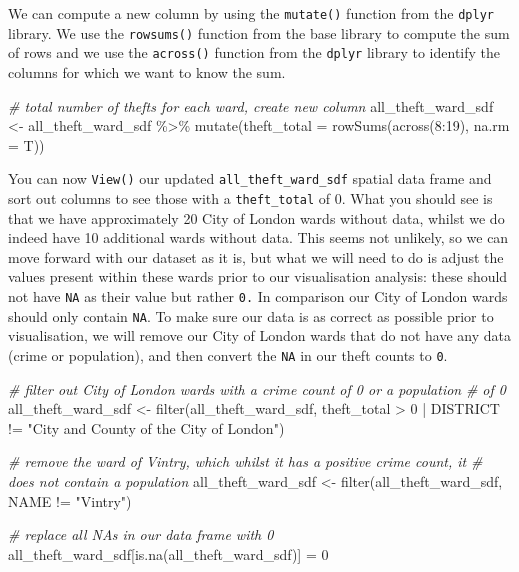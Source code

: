 \documentclass[
]{book}
\newenvironment{Shaded}{\begin{snugshade}}{\end{snugshade}}
\newcommand{\AttributeTok}[1]{\textcolor[rgb]{0.77,0.63,0.00}{#1}}
\newcommand{\CommentTok}[1]{\textcolor[rgb]{0.56,0.35,0.01}{\textit{#1}}}
\newcommand{\DecValTok}[1]{\textcolor[rgb]{0.00,0.00,0.81}{#1}}
\newcommand{\FunctionTok}[1]{\textcolor[rgb]{0.00,0.00,0.00}{#1}}
\newcommand{\NormalTok}[1]{#1}
\newcommand{\OtherTok}[1]{\textcolor[rgb]{0.56,0.35,0.01}{#1}}
\newcommand{\SpecialCharTok}[1]{\textcolor[rgb]{0.00,0.00,0.00}{#1}}
\newcommand{\StringTok}[1]{\textcolor[rgb]{0.31,0.60,0.02}{#1}}
\begin{document}
We can compute a new column by using the \texttt{mutate()} function from the \texttt{dplyr} library. We use the \texttt{rowsums()} function from the base library to compute the sum of rows and we use the \texttt{across()} function from the \texttt{dplyr} library to identify the columns for which we want to know the sum.

\begin{Shaded}
\begin{Highlighting}[]
\CommentTok{\# total number of thefts for each ward, create new column}
\NormalTok{all\_theft\_ward\_sdf }\OtherTok{\textless{}{-}}\NormalTok{ all\_theft\_ward\_sdf }\SpecialCharTok{\%\textgreater{}\%}
    \FunctionTok{mutate}\NormalTok{(}\AttributeTok{theft\_total =} \FunctionTok{rowSums}\NormalTok{(}\FunctionTok{across}\NormalTok{(}\DecValTok{8}\SpecialCharTok{:}\DecValTok{19}\NormalTok{), }\AttributeTok{na.rm =}\NormalTok{ T))}
\end{Highlighting}
\end{Shaded}

You can now \texttt{View()} our updated \texttt{all\_theft\_ward\_sdf} spatial data frame and sort out columns to see those with a \texttt{theft\_total} of 0. What you should see is that we have approximately 20 City of London wards without data, whilst we do indeed have 10 additional wards without data. This seems not unlikely, so we can move forward with our dataset as it is, but what we will need to do is adjust the values present within these wards prior to our visualisation analysis: these should not have \texttt{NA} as their value but rather \texttt{0.} In comparison our City of London wards should only contain \texttt{NA}. To make sure our data is as correct as possible prior to visualisation, we will remove our City of London wards that do not have any data (crime or population), and then convert the \texttt{NA} in our theft counts to \texttt{0}.

\begin{Shaded}
\begin{Highlighting}[]
\CommentTok{\# filter out City of London wards with a crime count of 0 or a population}
\CommentTok{\# of 0}
\NormalTok{all\_theft\_ward\_sdf }\OtherTok{\textless{}{-}} \FunctionTok{filter}\NormalTok{(all\_theft\_ward\_sdf, theft\_total }\SpecialCharTok{\textgreater{}} \DecValTok{0} \SpecialCharTok{|}\NormalTok{ DISTRICT }\SpecialCharTok{!=}
    \StringTok{"City and County of the City of London"}\NormalTok{)}

\CommentTok{\# remove the ward of Vintry, which whilst it has a positive crime count, it}
\CommentTok{\# does not contain a population}
\NormalTok{all\_theft\_ward\_sdf }\OtherTok{\textless{}{-}} \FunctionTok{filter}\NormalTok{(all\_theft\_ward\_sdf, NAME }\SpecialCharTok{!=} \StringTok{"Vintry"}\NormalTok{)}

\CommentTok{\# replace all NAs in our data frame with 0}
\NormalTok{all\_theft\_ward\_sdf[}\FunctionTok{is.na}\NormalTok{(all\_theft\_ward\_sdf)] }\OtherTok{=} \DecValTok{0}
\end{Highlighting}
\end{Shaded}
\end{document}
